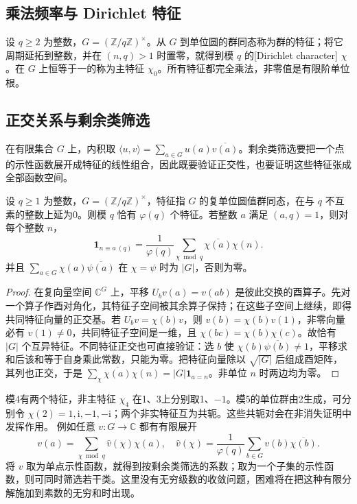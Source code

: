 \subsection{乘法频率与 Dirichlet 特征}
\label{b3:subsec:D0101}

设 \(q\ge2\) 为整数，\(G=(\mathbb Z/q\mathbb Z)^\times\)。从 \(G\) 到单位圆的群同态称为群的特征；将它周期延拓到整数，并在 \((n,q)>1\) 时置零，就得到模 \(q\) 的[Dirichlet character] \(\chi\)。在 \(G\) 上恒等于一的称为主特征 \(\chi_0\)。所有特征都完全乘法，非零值是有限阶单位根。

\subsection{正交关系与剩余类筛选}
\label{b3:subsec:D0102}

在有限集合 \(G\) 上，内积取 \(\langle u,v\rangle=\sum_{a\in G}u(a)\overline{v(a)}\)。剩余类筛选要把一个点的示性函数展开成特征的线性组合，因此既要验证正交性，也要证明这些特征张成全部函数空间。

\begin{proposition}[正交关系]\label{b3:prop:D-orthogonality}
设 \(q\ge1\) 为整数，\(G=(\mathbb Z/q\mathbb Z)^\times\)，特征指 \(G\) 的复单位圆值群同态，在与 \(q\) 不互素的整数上延为0。则模 \(q\) 恰有 \(\varphi(q)\) 个特征。若整数 \(a\) 满足 \((a,q)=1\)，则对每个整数 \(n\)，
\[
 \mathbf1_{n\equiv a\ (q)}=
 \frac1{\varphi(q)}\sum_{\chi\bmod q}\overline{\chi(a)}\chi(n).
\]
并且 \(\sum_{a\in G}\chi(a)\overline{\psi(a)}\) 在 \(\chi=\psi\) 时为 \(|G|\)，否则为零。
\end{proposition}
\begin{proof}
在复向量空间 \(\mathbb C^G\) 上，平移 \(U_bv(a)=v(ab)\) 是彼此交换的酉算子。先对一个算子作酉对角化，其特征子空间被其余算子保持；在这些子空间上继续，即得共同特征向量的正交基。若 \(U_bv=\chi(b)v\)，则 \(v(b)=\chi(b)v(1)\)，非零向量必有 \(v(1)\ne0\)，共同特征子空间是一维，且 \(\chi(bc)=\chi(b)\chi(c)\)。故恰有 \(|G|\) 个互异特征。不同特征正交也可直接验证：选 \(b\) 使 \(\chi(b)\overline{\psi(b)}\ne1\)，平移求和后该和等于自身乘此常数，只能为零。把特征向量除以 \(\sqrt{|G|}\) 后组成酉矩阵，其列也正交，于是 \(\sum_\chi\overline{\chi(a)}\chi(n)=|G|\mathbf1_{a=n}\)。非单位 \(n\) 时两边均为零。
\end{proof}
模4有两个特征，非主特征 \(\chi_4\) 在1、3上分别取1、\(-1\)。模5的单位群由2生成，可分别令 \(\chi(2)=1,\mathrm{i},-1,-\mathrm{i}\)；两个非实特征互为共轭。这些共轭对会在非消失证明中发挥作用。
\ProseParagraphBreak
例如任意 \(v:G\to\mathbb C\) 都有有限展开
\[
 v(a)=\sum_{\chi\bmod q}\widehat v(\chi)\chi(a),
 \quad
 \widehat v(\chi)=\frac1{\varphi(q)}\sum_{b\in G}v(b)\overline{\chi(b)}.
\]
将 \(v\) 取为单点示性函数，就得到按剩余类筛选的系数；取为一个子集的示性函数，则可同时筛选若干类。这里没有无穷级数的收敛问题，困难将在把这种有限分解施加到素数的无穷和时出现。


